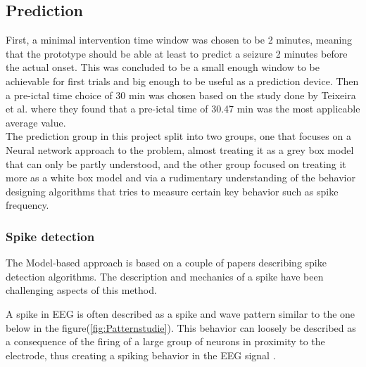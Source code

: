 \subsection{Prediction}

 First, a minimal intervention time window was chosen to be 2 minutes, meaning that the prototype should be able at least to predict a seizure 2 minutes before the actual onset. This was concluded to be a small enough window to be achievable for first trials and big enough to be useful as a prediction device. Then a pre-ictal time choice of 30 min was chosen based on the study done by Teixeira et al. \cite{computePrediction} where they found that a pre-ictal time of 30.47 min was the most applicable average value.\\



The prediction group in this project split into two groups, one that focuses on a Neural network approach to the problem, almost treating it as a grey box model that can only be partly understood, and the other group focused on treating it more as a white box model and via a rudimentary understanding of the behavior designing algorithms that tries to measure certain key behavior such as spike frequency.

\subsubsection{Spike detection}
The Model-based approach is based on a couple of papers describing spike detection algorithms.
The description and mechanics of a spike have been challenging aspects of this method.

A spike in EEG is often described as a spike and wave pattern similar to the one below in the figure(\ref{fig:Patternstudie}). This behavior can loosely be described as a consequence of the firing of a large group of neurons in proximity to the electrode, thus creating a spiking behavior in the EEG signal \cite{EEGPrimer}.

